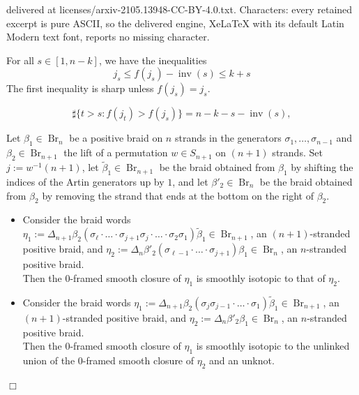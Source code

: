\documentclass[10pt,a4paper]{amsart}
\DeclareMathOperator{\inv}{inv}
\newcommand{\Br}{\operatorname{Br}}
\begin{document}
delivered at licenses/arxiv-2105.13948-CC-BY-4.0.txt. Characters: every retained excerpt is pure ASCII, so the delivered engine, XeLaTeX with its default Latin Modern text font, reports no missing character.
\begin{lemma}
\label{lem: inv}
For all $s\in [1,n-k]$, we have the inequalities
$$
j_s\le f(j_s)-\inv(s)\le k+s
$$
The first inequality is sharp unless $f(j_s)=j_s$.
\end{lemma}

\begin{equation}\label{eq: noninversions}
\sharp\{t>s: f(j_t)>f(j_s)\}=n-k-s-\inv(s),
\end{equation}

\begin{lemma}\label{lem:Markovsmooth} Let $\beta_1\in\Br_n$ be a positive braid on $n$ strands in the generators $\sigma_1,\ldots,\sigma_{n-1}$ and $\beta_2\in\Br_{n+1}$ the lift of a permutation $w\in S_{n+1}$ on $(n+1)$ strands. Set $j:=w^{-1}(n+1)$, let $\tilde{\beta}_1 \in \Br_{n+1}$ be the braid obtained from $\beta_1$
by shifting the indices of the Artin generators up by $1$, and let $\beta'_2 \in \Br_n$ be the braid obtained from $\beta_2$ by removing the strand that ends at the bottom on the right of $\beta_2$.


\begin{itemize}
    \item[$(1)$] Consider the braid words $\eta_1 := \Delta_{n+1}\beta_2 (\sigma_{\ell}\cdot\ldots\cdot\sigma_{j+1}\sigma_j\cdot\ldots\cdot\sigma_2\sigma_1)\tilde{\beta}_1 \in \Br_{n+1}$, an $(n+1)$-stranded positive braid, and $\eta_2:=\Delta_n\beta'_2(\sigma_{\ell - 1}\cdot\ldots\cdot\sigma_{j+1})\beta_1 \in \Br_n$, an $n$-stranded positive braid.
    \\

\noindent  Then the 0-framed smooth closure of $\eta_1$ is smoothly isotopic to that of $\eta_2$.\\

\item[$(2)$] Consider the braid words $\eta_1:=\Delta_{n+1}\beta_2(\sigma_{j}\sigma_{j-1}\cdot\ldots\cdot\sigma_1)\tilde{\beta}_1 \in \Br_{n+1}$, an $(n+1)$-stranded positive braid, and $\eta_2:=\Delta_n\beta'_2\beta_1\in \Br_n$, an $n$-stranded positive braid.
\\

\noindent  Then the 0-framed smooth closure of $\eta_1$ is smoothly isotopic to the unlinked union of the 0-framed smooth closure of  $\eta_2$ and an unknot.
\end{itemize}
\hfill$\Box$
\end{lemma}
\end{document}
